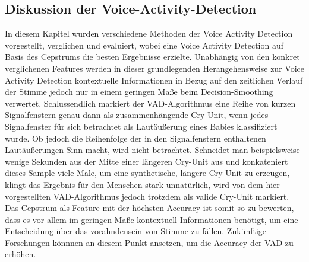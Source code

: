 \subsection{Diskussion der Voice-Activity-Detection}

In diesem Kapitel wurden verschiedene Methoden der Voice Activity Detection vorgestellt, verglichen und evaluiert, wobei eine Voice Activity Detection auf Basis des Cepstrums die besten Ergebnisse erzielte. Unabhängig von den konkret verglichenen Features werden in dieser grundlegenden Herangehensweise zur Voice Activity Detection kontextuelle Informationen in Bezug auf den zeitlichen Verlauf der Stimme jedoch nur in einem geringen Maße beim Decision-Smoothing verwertet. Schlussendlich markiert der VAD-Algorithmus eine Reihe von kurzen Signalfenstern genau dann als zusammenhängende Cry-Unit, wenn jedes Signalfenster für sich betrachtet als Lautäußerung eines Babies klassifiziert wurde. Ob jedoch die Reihenfolge der in den Signalfenstern enthaltenen Lautäußerungen Sinn macht, wird nicht betrachtet. Schneidet man beispielsweise wenige Sekunden aus der Mitte einer längeren Cry-Unit aus und konkateniert dieses Sample viele Male, um eine synthetische, längere Cry-Unit zu erzeugen, klingt das Ergebnis für den Menschen stark unnatürlich, wird von dem hier vorgestellten VAD-Algorithmus jedoch trotzdem als valide Cry-Unit markiert. Das Cepstrum als Feature mit der höchsten Accuracy ist somit so zu bewerten, dass es vor allem im geringen Maße kontextuell Informationen benötigt, um eine Entscheidung über das vorahndensein von Stimme zu fällen. Zukünftige Forschungen könnnen an diesem Punkt ansetzen, um die Accuracy der VAD zu erhöhen.





